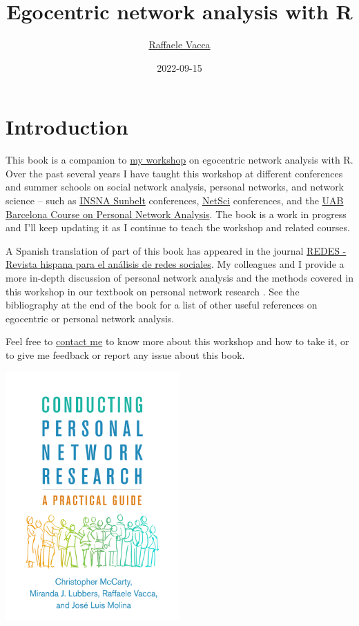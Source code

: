 \documentclass[
]{book}
\title{Egocentric network analysis with R}
\author{\href{http://www.raffaelevacca.com/}{Raffaele Vacca}}
\date{2022-09-15}
\begin{document}
\maketitle

{
\setcounter{tocdepth}{1}
\tableofcontents
}
\hypertarget{introduction}{%
\chapter{Introduction}\label{introduction}}

This book is a companion to \href{http://www.raffaelevacca.com/teaching/egocentric-r/}{my workshop} on egocentric network analysis with R. Over the past several years I have taught this workshop at different conferences and summer schools on social network analysis, personal networks, and network science -- such as \href{https://www.insna.org/}{INSNA Sunbelt} conferences, \href{https://netscisociety.net/home}{NetSci} conferences, and the \href{https://sway.office.com/1TpXMhGqKa7fTsAC}{UAB Barcelona Course on Personal Network Analysis}. The book is a work in progress and I'll keep updating it as I continue to teach the workshop and related courses.

A Spanish translation of part of this book has appeared in the journal \href{https://revistes.uab.cat/redes/article/view/v31-n2-vacca}{REDES - Revista hispana para el análisis de redes sociales}. My colleagues and I provide a more in-depth discussion of personal network analysis and the methods covered in this workshop in our textbook on personal network research \citep{mccarty_conducting_2019}. See the bibliography at the end of the book for a list of other useful references on egocentric or personal network analysis.

Feel free to \href{http://www.raffaelevacca.com/}{contact me} to know more about this workshop and how to take it, or to give me feedback or report any issue about this book.

\href{https://www.guilford.com/books/Conducting-Personal-Network-Research/McCarty-Lubbers-Vacca-Molina/9781462538386/authors}{\includegraphics[width=0.5\textwidth,height=\textheight]{./Figures/McCarty_et_al_2019_cover.jpg}}
\end{document}
